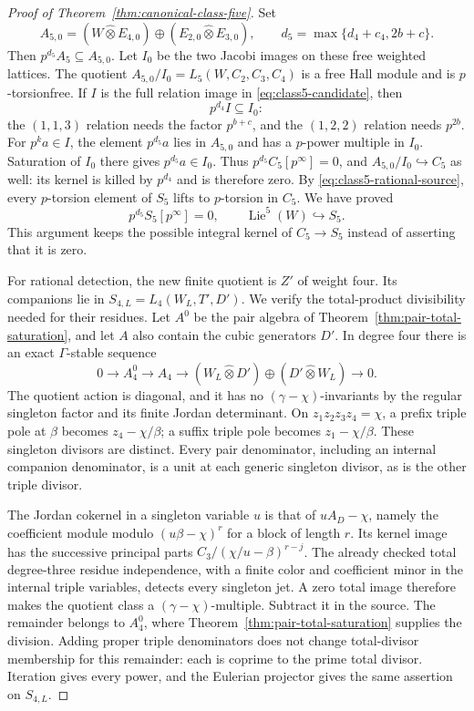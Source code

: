 \documentclass[11pt]{article}
\theoremstyle{definition}\newtheorem{definition}[theorem]{Definition}
\begin{document}
\begin{proof}[Proof of Theorem~\ref{thm:canonical-class-five}]
Set
\[
 A_{5,0}=(W\widehat\otimes E_{4,0})\oplus
                          (E_{2,0}\widehat\otimes E_{3,0}),
 \qquad d_5=\max\{d_4+c_4,2b+c\}.
\]
Then $p^{d_5}A_5\subseteq A_{5,0}$. Let $I_0$ be the
two Jacobi images on these free weighted lattices.
The quotient $A_{5,0}/I_0=L_5(W,C_2,C_3,C_4)$ is a
free Hall module and is $p$-torsionfree. If $I$ is
the full relation image in \eqref{eq:class5-candidate},
then
\[
                              p^{d_4}I\subseteq I_0:
\]
the $(1,1,3)$ relation needs the factor $p^{b+c}$,
and the $(1,2,2)$ relation needs $p^{2b}$.
For $p^ka\in I$, the element $p^{d_5}a$ lies in
$A_{5,0}$ and has a $p$-power multiple in $I_0$.
Saturation of $I_0$ there gives $p^{d_5}a\in I_0$.
Thus $p^{d_5}C_5[p^\infty]=0$, and
$A_{5,0}/I_0\hookrightarrow C_5$ as well: its kernel
is killed by $p^{d_4}$ and is therefore zero.
By \eqref{eq:class5-rational-source}, every $p$-torsion
element of $S_5$ lifts to $p$-torsion in $C_5$.
We have proved
\begin{equation}\label{eq:class5-pbound}
 p^{d_5}S_5[p^\infty]=0,
 \qquad\operatorname{Lie}^5(W)\hookrightarrow S_5.
\end{equation}
This argument keeps the possible integral kernel of
$C_5\to S_5$ instead of asserting that it is zero.

For rational detection, the new finite quotient is
$Z'$ of weight four. Its companions lie in
$S_{4,L}=L_4(W_L,T',D')$. We verify the total-product
divisibility needed for their residues. Let $A^0$
be the pair algebra of
Theorem~\ref{thm:pair-total-saturation}, and let $A$
also contain the cubic generators $D'$. In degree
four there is an exact $\Gamma$-stable sequence
\[
 0\longrightarrow A^0_4\longrightarrow A_4
 \longrightarrow(W_L\widehat\otimes D')
                    \oplus(D'\widehat\otimes W_L)\longrightarrow0.
\]
The quotient action is diagonal, and it has no
$(\gamma-\chi)$-invariants by the regular singleton
factor and its finite Jordan determinant.
On $z_1z_2z_3z_4=\chi$, a prefix triple pole at $\beta$
becomes $z_4-\chi/\beta$; a suffix triple pole becomes
$z_1-\chi/\beta$. These singleton divisors are distinct.
Every pair denominator, including an internal
companion denominator, is a unit at each generic
singleton divisor, as is the other triple divisor.

The Jordan cokernel in a singleton variable $u$ is
that of $uA_D-\chi$, namely the coefficient module
modulo $(u\beta-\chi)^r$ for a block of length $r$.
Its kernel image has the successive principal parts
$C_3/(\chi/u-\beta)^{r-j}$. The already checked total
degree-three residue independence, with a finite
color and coefficient minor in the internal triple
variables, detects every singleton jet. A zero total
image therefore makes the quotient class a
$(\gamma-\chi)$-multiple. Subtract it in the source.
The remainder belongs to $A^0_4$, where
Theorem~\ref{thm:pair-total-saturation} supplies the
division. Adding proper triple denominators does
not change total-divisor membership for this
remainder: each is coprime to the prime total divisor.
Iteration gives every power, and the Eulerian
projector gives the same assertion on $S_{4,L}$.


\end{proof}
\end{document}

